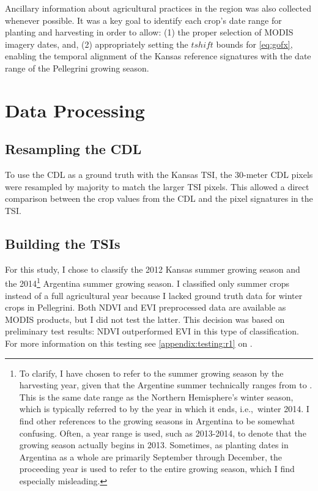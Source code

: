 Ancillary information about agricultural practices in the region was also collected whenever possible. It was a key goal to identify each crop's date range for planting and harvesting in order to allow: (1) the proper selection of MODIS imagery dates, and, (2) appropriately setting the $tshift$ bounds for \autoref{eq:gofx}, enabling the temporal alignment of the Kansas reference signatures with the date range of the Pellegrini growing season.

\section{Data Processing}

\subsection{Resampling the CDL}

To use the CDL as a ground truth with the Kansas TSI, the 30-meter CDL pixels were resampled by majority to match the larger TSI pixels. This allowed a direct comparison between the crop values from the CDL and the pixel signatures in the TSI.

\subsection{Building the TSIs}
\label{buildingTSIs}

For this study, I chose to classify the 2012 Kansas summer growing season and the 2014\footnote{To clarify, I have chosen to refer to the summer growing season by the harvesting year, given that the Argentine summer technically ranges from  to . This is the same date range as the Northern Hemisphere's winter season, which is typically referred to by the year in which it ends, i.e.,\ winter 2014. I find other references to the growing seasons in Argentina to be somewhat confusing. Often, a year range is used, such as 2013-2014, to denote that the growing season actually begins in 2013. Sometimes, as planting dates in Argentina as a whole are primarily September through December, the proceeding year is used to refer to the entire growing season, which I find especially misleading.} Argentina summer growing season. I classified only summer crops instead of a full agricultural year because I lacked ground truth data for winter crops in Pellegrini.  Both NDVI and EVI preprocessed data are available as MODIS products, but I did not test the latter. This decision was based on preliminary test results: NDVI outperformed EVI in this type of classification. For more information on this testing see \autoref{appendix:testing:r1} on .

